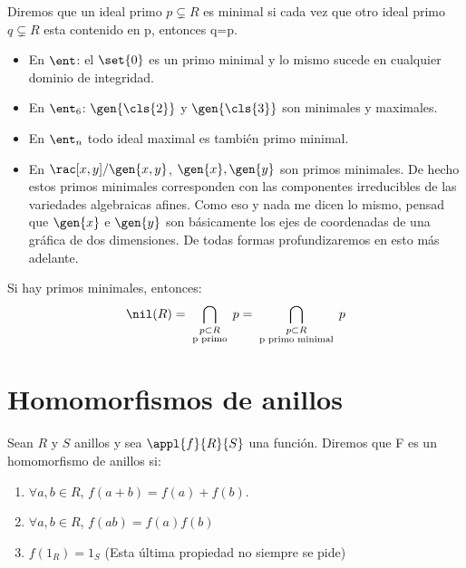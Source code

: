 \begin{defn}
	Diremos que un ideal primo $p \subsetneq R$ es minimal si cada vez que otro ideal primo $q \subsetneq R$ esta contenido en p, entonces q=p.
\end{defn}

\begin{example}
	\begin{itemize}
		\item En $\ent$: el $\set{0}$ es un primo minimal y lo mismo sucede en cualquier dominio de integridad.
		\item En $\ent_6$: $\gen{\cls{2}}$ y $\gen{\cls{3}}$ son minimales y maximales.
		\item En $\ent_n$ todo ideal maximal es también primo minimal.
		\item En $\rac[x,y]/\gen{x,y}$, $\gen{x},\gen{y}$ son primos minimales. De hecho estos primos minimales corresponden con las componentes irreducibles de las variedades  algebraicas afines. Como eso y nada me dicen lo mismo, pensad que $\gen{x}$ e $\gen{y}$ son básicamente los ejes de coordenadas de una gráfica de dos dimensiones. De todas formas profundizaremos en esto más adelante.
	\end{itemize}
\end{example}

\obs Si hay primos minimales, entonces:
$$ \nil(R)=\bigcap_{\substack{p\subset R \\ \text{ p primo }}} p = \bigcap_{\substack{p\subset R \\ \text{ p primo minimal }}}p $$

\section{Homomorfismos de anillos}

\begin{defn} \label{def:Homomorfismo} Sean $R$ y $S$ anillos y sea $\appl{f}{R}{S}$ una función. Diremos que F es un homomorfismo de anillos si:
\begin{enumerate}
	\item $\forall a,b \in R$, $f(a+b)=f(a)+f(b)$.
	\item $\forall a,b \in R$, $f(ab)=f(a)f(b)$
	\item $f(1_R)=1_S$ (Esta última propiedad no siempre se pide)
\end{enumerate}
\end{defn}


